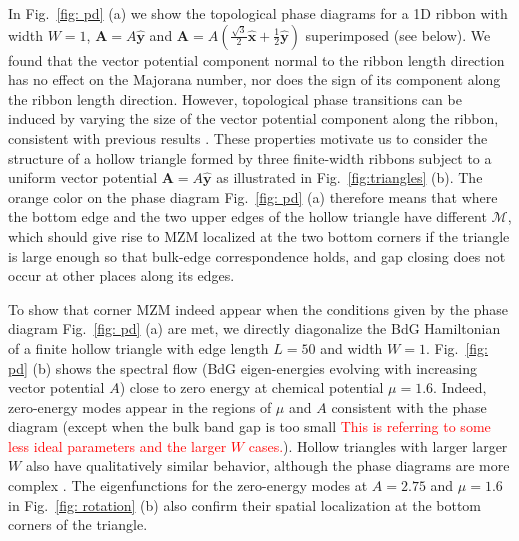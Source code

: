 \documentclass[aps,prb,showpacs,amsmath,twocolumn,amssymb,superscriptaddress]{revtex4-2}
\newcommand{\Red}[1]{\textcolor{red}{#1}}
\let\oldhat\hat
\renewcommand{\hat}[1]{\oldhat{\mathbf{#1}}}
\begin{document}
In Fig.~\ref{fig: pd} (a) we show the topological phase diagrams for a 1D ribbon with width $W=1$, $\mathbf A = A\hat{y}$ and $\mathbf A = A(\frac{\sqrt{3}}{2}\hat{x}+\frac{1}{2}\hat{y})$ superimposed (see below). We found that the vector potential component normal to the ribbon length direction has no effect on the Majorana number, nor does the sign of its component along the ribbon length direction. However, topological phase transitions can be induced by varying the size of the vector potential component along the ribbon, consistent with previous results \cite{romitoManipulatingMajoranaFermions2012, takasanSupercurrentinducedTopologicalPhase2022}. These properties motivate us to consider the structure of a hollow triangle formed by three finite-width ribbons subject to a uniform vector potential $\mathbf A = A\hat{y}$ as illustrated in Fig.~\ref{fig:triangles} (b). The orange color on the phase diagram Fig.~\ref{fig: pd} (a) therefore means that where the bottom edge and the two upper edges of the hollow triangle have different $\mathcal{M}$, which should give rise to MZM localized at the two bottom corners if the triangle is large enough so that bulk-edge correspondence holds, and gap closing does not occur at other places along its edges.

To show that corner MZM indeed appear when the conditions given by the phase diagram Fig.~\ref{fig: pd} (a) are met, we directly diagonalize the BdG Hamiltonian of a finite hollow triangle with edge length $L=50$ and width $W=1$. Fig.~\ref{fig: pd} (b) shows the spectral flow (BdG eigen-energies evolving with increasing vector potential $A$) close to zero energy at chemical potential $\mu=1.6$. Indeed, zero-energy modes appear in the regions of $\mu$ and $A$ consistent with the phase diagram (except when the bulk band gap is too small \cite{supp} \Red{This is referring to some less ideal parameters and the larger $W$ cases.}). Hollow triangles with larger larger $W$ also have qualitatively similar behavior, although the phase diagrams are more complex \cite{supp}. The eigenfunctions for the zero-energy modes at $A=2.75$ and $\mu=1.6$ in Fig.~\ref{fig: rotation} (b) also confirm their spatial localization at the bottom corners of the triangle.
\end{document}

